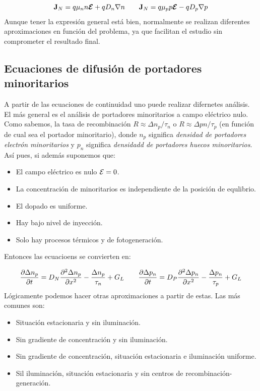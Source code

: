 \begin{equation}
	\mathbf{J}_N = q \mu_n n \boldsymbol{\mathcal{E}} + q D_n \nabla n \qquad 
	\mathbf{J}_N = q \mu_p p  \boldsymbol{\mathcal{E}} - q D_p \nabla p
\end{equation}
Aunque tener la expresión general está bien, normalmente se realizan diferentes aproximaciones en función del problema, ya que facilitan el estudio sin comprometer el resultado final.

\subsection{Ecuaciones de difusión de portadores minoritarios}

A partir de las ecuaciones de continuidad uno puede realizar difernetes análisis. El más general es el análisis de portadores minoritarios a campo eléctrico nulo. Como sabemos, la tasa de recombinación $R\approx \Delta n_p/\tau_n$ o $R\approx \Delta pn / \tau_p$ (en función de cual sea el portador minoritario), donde $n_p$ significa \textit{densidad de portadores electrón minoritarios} y $p_n$ significa \textit{densidadd de portadores huecos minoritarios}. Así pues, si además suponemos que:

\begin{itemize}
	\item El campo eléctrico es nulo $\mathcal{E} = 0$. 
	\item La concentración de minoritarios es independiente de la posición de equlibrio.
	\item El dopado es uniforme.
	\item Hay bajo nivel de inyección.
	\item Solo hay procesos térmicos y de fotogeneración.
\end{itemize}
Entonces las ecuacioens se convierten en:

\begin{equation}
	\frac{\partial \Delta n_p}{\partial t} = D_N \frac{\partial ^2 \Delta n_p}{\partial x^2} - \frac{\Delta n_p}{\tau_n} + G_L \qquad 
	\frac{\partial \Delta p_n}{\partial t} = D_P \frac{\partial ^2 \Delta p_n}{\partial x^2} - \frac{\Delta p_n}{\tau_p} + G_L
\end{equation}
Lógicamente podemos hacer otras aproximaciones a partir de estas. Las más comunes son:

\begin{itemize}
	\item Situación estacionaria y sin iluminación.
	\item Sin gradiente de concentración y sin iluminación.
	\item Sin gradiente de concentración, situación estacionaria e iluminación uniforme.
	\item Sil iluminación, situación estacionaria y sin centros de recombinación-generación.
\end{itemize}

